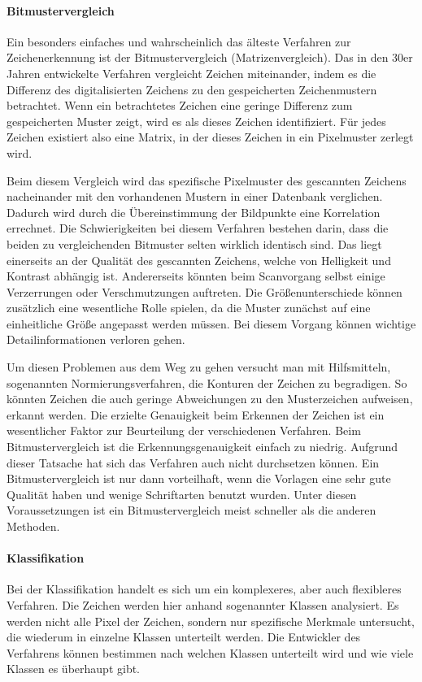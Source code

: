 \paragraph{Bitmustervergleich}
Ein besonders einfaches und wahrscheinlich das älteste Verfahren zur Zeichenerkennung ist der Bitmustervergleich (Matrizenvergleich). Das in den 30er Jahren entwickelte Verfahren vergleicht Zeichen miteinander, indem es die Differenz des digitalisierten Zeichens zu den gespeicherten Zeichenmustern betrachtet. Wenn ein betrachtetes Zeichen eine geringe Differenz zum gespeicherten Muster zeigt, wird es als dieses Zeichen identifiziert. Für jedes Zeichen existiert also eine Matrix, in der dieses Zeichen in ein Pixelmuster zerlegt wird.


Beim diesem Vergleich wird das spezifische Pixelmuster des gescannten Zeichens nacheinander mit den vorhandenen Mustern in einer Datenbank verglichen. Dadurch wird durch die Übereinstimmung der Bildpunkte eine Korrelation errechnet. Die Schwierigkeiten bei diesem Verfahren bestehen darin, dass die beiden zu vergleichenden Bitmuster selten wirklich identisch sind. Das liegt einerseits an der Qualität des gescannten Zeichens, welche von Helligkeit und Kontrast abhängig ist. Andererseits könnten beim Scanvorgang selbst einige Verzerrungen oder Verschmutzungen auftreten. Die Größenunterschiede können zusätzlich eine wesentliche Rolle spielen, da die Muster zunächst auf eine einheitliche Größe angepasst werden müssen. Bei diesem Vorgang können wichtige Detailinformationen verloren gehen.

Um diesen Problemen aus dem Weg zu gehen versucht man mit Hilfsmitteln, sogenannten Normierungsverfahren, die Konturen der Zeichen zu begradigen. So könnten Zeichen die auch geringe Abweichungen zu den Musterzeichen aufweisen, erkannt werden. Die erzielte Genauigkeit beim Erkennen der Zeichen ist ein wesentlicher Faktor zur Beurteilung der verschiedenen Verfahren. Beim Bitmustervergleich ist die Erkennungsgenauigkeit einfach zu niedrig. Aufgrund dieser Tatsache hat sich das Verfahren auch nicht durchsetzen können. Ein Bitmustervergleich ist nur dann vorteilhaft, wenn die Vorlagen eine sehr gute Qualität haben und wenige Schriftarten benutzt wurden. Unter diesen Voraussetzungen ist ein Bitmustervergleich meist schneller als die anderen Methoden.

\paragraph{Klassifikation}
Bei der Klassifikation handelt es sich um ein komplexeres, aber auch flexibleres Verfahren. Die Zeichen werden hier anhand sogenannter Klassen analysiert. Es werden nicht alle Pixel der Zeichen, sondern nur spezifische Merkmale untersucht, die wiederum in einzelne Klassen unterteilt werden. Die Entwickler des Verfahrens können bestimmen nach welchen Klassen unterteilt wird und wie viele Klassen es überhaupt gibt.

